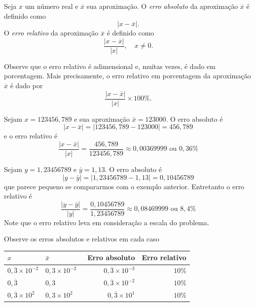 \begin{defn} Seja $x$ um número real e $\overline{x}$ sua aproximação. O \emph{erro absoluto} da aproximação $\overline{x}$ é definido como
  \begin{equation*}
    |x-\overline{x}|.
  \end{equation*}
O \emph{erro relativo} da aproximação $\overline{x}$ é definido como
\begin{equation*}
\frac{|x-\overline{x}|}{|x|},\quad x\neq 0.
\end{equation*}
\end{defn}

\begin{obs}
  Observe que o erro relativo é adimensional e, muitas vezes, é dado em porcentagem. Mais precisamente, o erro relativo em porcentagem da aproximação $\overline{x}$ é dado por
  \begin{equation*}
    \frac{|x-\bar{x}|}{|x|}\times 100 \%.
  \end{equation*}
\end{obs}

\begin{ex}
Sejam $x=123456,789$ e sua aproximação $\bar{x}=123000$. O erro absoluto é
$$
|x-\bar{x}|=|123456,789-123000|=456,789
$$
e o erro relativo é
$$
\frac{|x-\bar{x}|}{|x|}=\frac{456,789}{123456,789}\approx 0,00369999 \text{ ou }0,36\%
$$
\end{ex}

\begin{ex}
Sejam $y=1,23456789$ e $\bar{y}=1,13$. O erro absoluto é
$$
|y-\bar{y}|=|1,23456789-1,13|=0,10456789
$$
que parece pequeno se compararmos com o exemplo anterior. Entretanto o erro relativo é
$$
\frac{|y-\bar{y}|}{|y|}=\frac{0,10456789}{1,23456789}\approx 0,08469999 \text{ ou }8,4\%
$$
Note que o erro relativo leva em consideração a escala do problema.
\end{ex}



\begin{ex}
Observe os erros absolutos e relativos em cada caso
\begin{center}
  \begin{tabular}{ll|rr} \hline
    $x$ & $\bar{x}$ &\ Erro absoluto & Erro relativo\\\hline
    $0,\overline{3}\times 10^{-2}$ & $0,3\times 10^{-2}$ & $0,\overline{3}\times 10^{-3}$ & $10\%$\\ 
    $0,\overline{3}$              & $0,3$ & $0,\overline{3}\times 10^{-2}$ & $10\%$\\ 
    $0,\overline{3}\times 10^{2}$ & $0,3\times 10^{2}$ & $0,\overline{3}\times 10^{1}$ & $10\%$\\\hline
\end{tabular}  
\end{center}
\end{ex}

